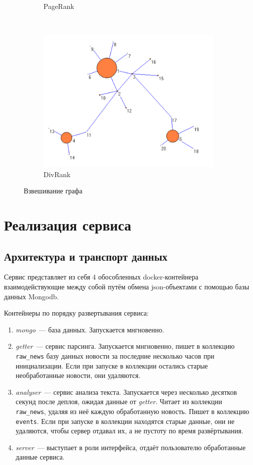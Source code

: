 \documentclass[a4paper, 14pt]{extarticle}
\begin{document}
\begin{figure}[h]
\begin{subfigure}[b]{0.3\textwidth}
		\caption{PageRank}
	\end{subfigure}
	~ 
	\begin{subfigure}[b]{0.3\textwidth}
		\includegraphics[width=\textwidth]{DivR}
		\caption{DivRank}
	\end{subfigure}
	\caption{Взвешивание графа}
	\label{div}
\end{figure}


\section{Реализация сервиса}
\subsection{Архитектура и транспорт данных}
Сервис представляет из себя 4 обособленных docker-контейнера взаимодействующие между собой путём обмена json-объектами с помощью базы данных Mongodb.

Контейнеры по порядку развертывания сервиса:
\begin{enumerate}
	\item {\it mongo}~--- база данных. Запускается мнгновенно.
	\item {\it getter}~--- сервис парсинга. Запускается мнгновенно, пишет в коллекцию \texttt{raw\_news} базу данных новости за последние несколько часов при инициализации. Если при запуске в коллекции остались старые необработанные новости, они удаляются.
	\item {\it analyser}~--- сервис анализа текста. Запускается через несколько десятков секунд после деплоя, ожидая данные от {\it getter}. Читает из коллекции \texttt{raw\_news}, удаляя из неё каждую обработанную новость. Пишет в коллекцию \texttt{events}. Если при запуске в коллекции находятся старые данные, они не удаляются, чтобы сервер отдавал их, а не пустоту по время развёртывания.
	\item {\it server}~--- выступает в роли интерфейса, отдаёт пользователю обработанные данные сервиса.
\end{enumerate}
\end{document}
